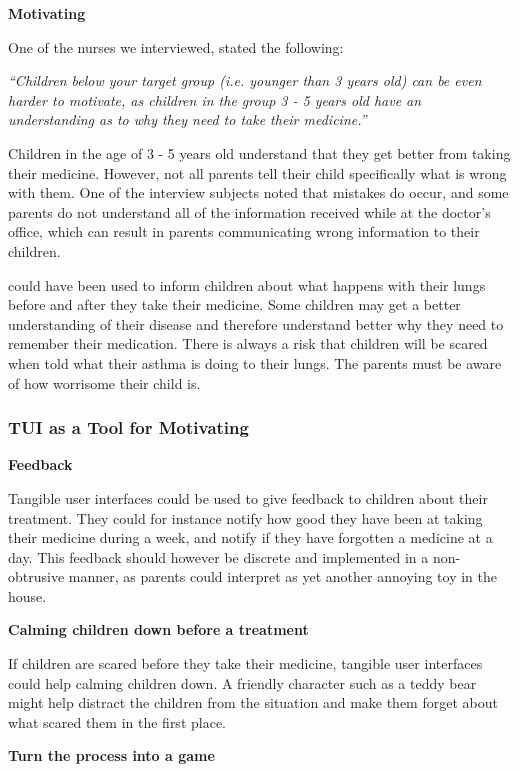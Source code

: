 \textbf{Motivating}

One of the nurses we interviewed, stated the following: 

\textit{``Children below your target group (i.e. younger than 3 years old) can be even harder to motivate, as children in the group 3 - 5 years old have an understanding as to why they need to take their medicine.''}

Children in the age of 3 - 5 years old understand that they get better from taking their medicine. However, not all parents tell their child specifically what is wrong with them. One of the interview subjects noted that mistakes do occur, and some parents do not understand all of the information received while at the doctor's office, which can result in parents communicating wrong information to their children. 
 
\buddy{} could have been used to inform children about what happens with their lungs before and after they take their medicine.
Some children may get a better understanding of their disease and therefore understand better why they need to remember their medication. There is always a risk that children will be scared when told what their asthma is doing to their lungs. The parents must be aware of how worrisome their child is. 


\subsubsection{TUI as a Tool for Motivating}
\label{sec:tuiasatoolformotivating}

\textbf{Feedback}

Tangible user interfaces could be used to give feedback to children about their treatment. They could for instance notify how good they have been at taking their medicine during a week, and notify if they have forgotten a medicine at a day. This feedback should however be discrete and implemented in a non-obtrusive manner, as parents could interpret \ab{} as yet another annoying toy in the house.   


\textbf{Calming children down before a treatment}

If children are scared before they take their medicine, tangible user interfaces could help calming children down. A friendly character such as a teddy bear might help distract the children from the situation and make them forget about what scared them in the first place. 


\textbf{Turn the process into a game}

